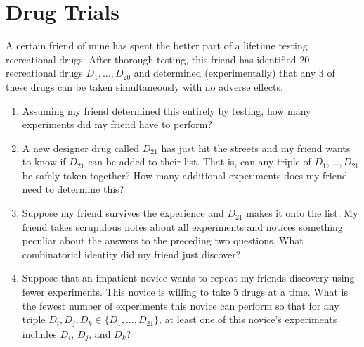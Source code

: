 \documentclass{article}
\begin{document}
\section{Drug Trials}

A certain friend of mine has spent the better part of a lifetime testing recreational drugs. After thorough testing, this friend has identified 20 recreational drugs $D_1,\ldots,D_{20}$ and determined (experimentally) that any 3 of these drugs can be taken simultaneously with no adverse effects.


\begin{enumerate}

   \item Assuming my friend determined this entirely by testing, how many experiments did my friend have to perform?

   \item A new designer drug called $D_{21}$ has just hit the streets and my friend wants to know if $D_{21}$ can be added to their list. That is, can any triple of $D_1,\ldots,D_{21}$ be safely taken together? How many additional experiments does my friend need to determine this?
   
   \item Suppose my friend survives the experience and $D_{21}$ makes it onto the list. My friend takes scrupulous notes about all experiments and notices something peculiar about the answers to the preceding two questions. What combinatorial identity did my friend just discover?
   
   \item Suppose that an impatient novice wants to repeat my friends discovery using fewer experiments. This novice is willing to take 5 drugs at a time. What is the fewest number of experiments this novice can perform so that for any triple $D_i,D_j,D_k\in\{D_1,\ldots,D_{21}\}$, at least one of this novice's experiments includes $D_i$, $D_j$, and $D_k$?

\end{enumerate}
\end{document}
